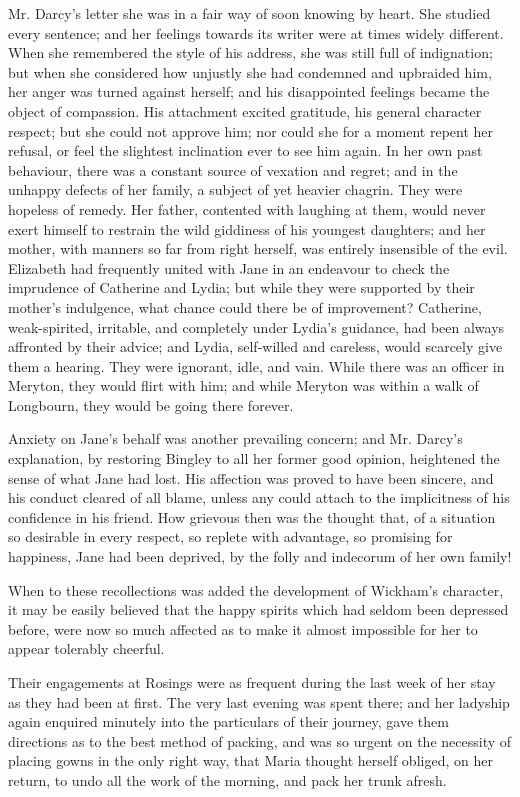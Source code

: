 Mr. Darcy's letter she was in a fair way of soon knowing by heart. She studied every sentence; and her feelings towards its writer were at times widely different. When she remembered the style of his address, she was still full of indignation; but when she considered how unjustly she had condemned and upbraided him, her anger was turned against herself; and his disappointed feelings became the object of compassion. His attachment excited gratitude, his general character respect; but she could not approve him; nor could she for a moment repent her refusal, or feel the slightest inclination ever to see him again. In her own past behaviour, there was a constant source of vexation and regret; and in the unhappy defects of her family, a subject of yet heavier chagrin. They were hopeless of remedy. Her father, contented with laughing at them, would never exert himself to restrain the wild giddiness of his youngest daughters; and her mother, with manners so far from right herself, was entirely insensible of the evil. Elizabeth had frequently united with Jane in an endeavour to check the imprudence of Catherine and Lydia; but while they were supported by their mother's indulgence, what chance could there be of improvement? Catherine, weak-spirited, irritable, and completely under Lydia's guidance, had been always affronted by their advice; and Lydia, self-willed and careless, would scarcely give them a hearing. They were ignorant, idle, and vain. While there was an officer in Meryton, they would flirt with him; and while Meryton was within a walk of Longbourn, they would be going there forever.

Anxiety on Jane's behalf was another prevailing concern; and Mr. Darcy's explanation, by restoring Bingley to all her former good opinion, heightened the sense of what Jane had lost. His affection was proved to have been sincere, and his conduct cleared of all blame, unless any could attach to the implicitness of his confidence in his friend. How grievous then was the thought that, of a situation so desirable in every respect, so replete with advantage, so promising for happiness, Jane had been deprived, by the folly and indecorum of her own family!

When to these recollections was added the development of Wickham's character, it may be easily believed that the happy spirits which had seldom been depressed before, were now so much affected as to make it almost impossible for her to appear tolerably cheerful.

Their engagements at Rosings were as frequent during the last week of her stay as they had been at first. The very last evening was spent there; and her ladyship again enquired minutely into the particulars of their journey, gave them directions as to the best method of packing, and was so urgent on the necessity of placing gowns in the only right way, that Maria thought herself obliged, on her return, to undo all the work of the morning, and pack her trunk afresh.

